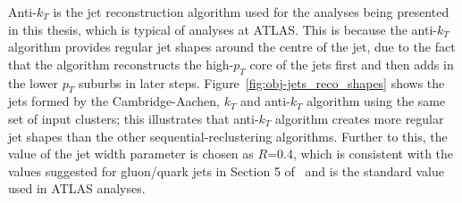 Anti-$k_T$ is the jet reconstruction algorithm used for the analyses being presented in this thesis, which is typical of analyses at ATLAS.
This is because the anti-$k_T$ algorithm provides regular jet shapes around the centre of the jet,
due to the fact that the algorithm reconstructs the high-$p_T$ core of the jets first and then adds in the lower $p_T$ suburbs in later steps.
Figure~\ref{fig:obj-jets_reco_shapes} shows the jets formed by the Cambridge-Aachen, $k_T$ and anti-$k_T$ algorithm using the same set of input clusters;
this illustrates that anti-$k_T$ algorithm creates more regular jet shapes than the other sequential-reclustering algorithms.
Further to this, the value of the jet width parameter is chosen as $R$=0.4,
which is consistent with the values suggested for gluon/quark jets in Section 5 of~\cite{obj-jets_reco_salam}
and is the standard value used in ATLAS analyses.

